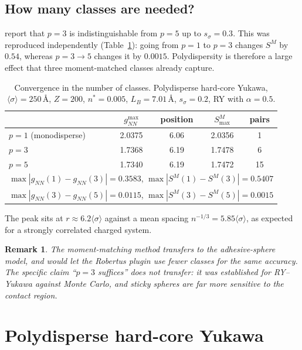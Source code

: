 \documentclass[11pt,a4paper]{article}
\newtheorem{remark}{Remark}
\begin{document}
\subsection{How many classes are needed?}

\cite{daguanno1992} report that $p=3$ is indistinguishable from $p=5$ up to
$s_\sigma=0.3$. This was reproduced independently
(Table~\ref{tab:pconv}): going from $p=1$ to $p=3$ changes $S^M$ by $0.54$,
whereas $p=3\rightarrow5$ changes it by $0.0015$. Polydispersity is therefore
a large effect that three moment-matched classes already capture.

\begin{table}[htbp]
\centering
\caption{Convergence in the number of classes. Polydisperse hard-core Yukawa,
$\langle\sigma\rangle=250$\,\AA, $Z=200$, $n^*=0.005$, $L_B=7.01$\,\AA,
$s_\sigma=0.2$, RY with $\alpha=0.5$.}
\label{tab:pconv}
\begin{tabular}{lcccc}
\toprule
 & $g_{NN}^{\max}$ & position & $S^{M}_{\max}$ & pairs \\
\midrule
$p=1$ (monodisperse) & 2.0375 & 6.06 & 2.0356 & 1 \\
$p=3$                & 1.7368 & 6.19 & 1.7478 & 6 \\
$p=5$                & 1.7340 & 6.19 & 1.7472 & 15 \\
\midrule
\multicolumn{5}{l}{$\max|g_{NN}(1)-g_{NN}(3)|=0.3583$,\quad
                   $\max|S^M(1)-S^M(3)|=0.5407$}\\
\multicolumn{5}{l}{$\max|g_{NN}(3)-g_{NN}(5)|=0.0115$,\quad
                   $\max|S^M(3)-S^M(5)|=0.0015$}\\
\bottomrule
\end{tabular}
\end{table}

The peak sits at $r\approx6.2\langle\sigma\rangle$ against a mean spacing
$n^{-1/3}=5.85\langle\sigma\rangle$, as expected for a strongly correlated
charged system.

\begin{remark}
The moment-matching method transfers to the adhesive-sphere model, and would
let the Robertus plugin use fewer classes for the same accuracy. The specific
claim ``$p=3$ suffices'' does \emph{not} transfer: it was established for
RY--Yukawa against Monte Carlo, and sticky spheres are far more sensitive to
the contact region.
\end{remark}

\section{Polydisperse hard-core Yukawa}
\end{document}

